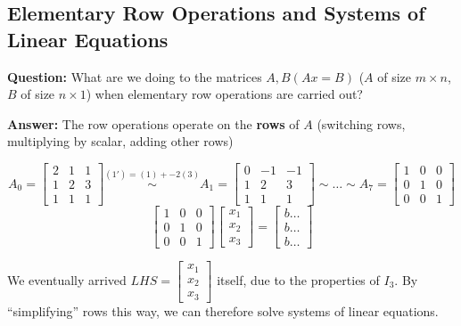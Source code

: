 
\subsection{Elementary Row Operations and Systems of Linear Equations}
\textbf{Question:} What are we doing to the matrices \(A, B (Ax = B)\) (\(A\) of size \(m \times n\), \(B\) of size \(n \times 1\)) when elementary row operations are carried out?

\textbf{Answer:} The row operations operate on the \textbf{rows} of \(A\) (switching rows, multiplying by scalar, adding other rows)

\begin{example}
    \[
        A_0 = \left[\begin{array}{ccc}
                2 & 1 & 1 \\
                1 & 2 & 3 \\
                1 & 1 & 1
            \end{array}\right]
        \overset{(1') = (1) + -2(3)}{\sim}
        A_1 = \left[\begin{array}{ccc}
                0 & -1 & -1 \\
                1 & 2  & 3  \\
                1 & 1  & 1
            \end{array}\right]
        \sim \dots \sim
        A_7 = \left[\begin{array}{ccc}
                1 & 0 & 0 \\
                0 & 1 & 0 \\
                0 & 0 & 1
            \end{array}\right]
    \]
    \[
        \left[\begin{array}{ccc}
                1 & 0 & 0 \\
                0 & 1 & 0 \\
                0 & 0 & 1
            \end{array}\right]
        \left[\begin{array}{c}
                x_1 \\
                x_2 \\
                x_3
            \end{array}\right] =
        \left[\begin{array}{c}
                b \dots \\
                b \dots \\
                b \dots
            \end{array}\right]
    \]

    We eventually arrived \(LHS = \left[\begin{array}{c}
            x_1 \\
            x_2 \\
            x_3
        \end{array}\right]\) itself, due to the properties of \(I_3\). By ``simplifying'' rows this way, we can therefore solve systems of linear equations.
\end{example}

